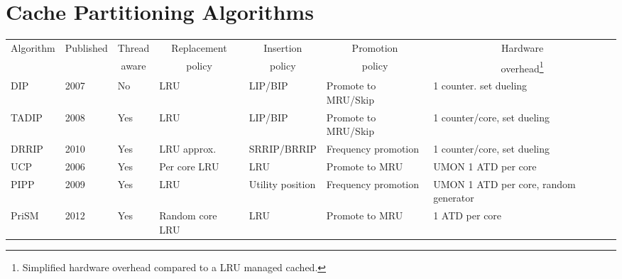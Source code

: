 
\chapter{Cache Partitioning Algorithms}
\label{cpt:algorithms}

\begin{table}[h]
\begin{tabular}{|l|l|l|l|l|l|l|}
\hline
\multicolumn{1}{|c|}{Algorithm} & \multicolumn{1}{c|}{Published} & \multicolumn{1}{c|}{Thread} & \multicolumn{1}{c|}{Replacement} & \multicolumn{1}{c|}{Insertion} & \multicolumn{1}{c|}{Promotion} & \multicolumn{1}{c|}{Hardware}         \\
\multicolumn{1}{|c|}{}          & \multicolumn{1}{c|}{}          & \multicolumn{1}{c|}{aware}  & \multicolumn{1}{c|}{policy}      & \multicolumn{1}{c|}{policy}    & \multicolumn{1}{c|}{policy}    & \multicolumn{1}{c|}{overhead\footnote{Simplified hardware overhead compared to a LRU managed cached.}}         \\ \hline
DIP                             & 2007                           & No                          & LRU                              & LIP/BIP                        & Promote to MRU/Skip            & 1 counter. set dueling                \\ \hline
TADIP                           & 2008                           & Yes                         & LRU                              & LIP/BIP                        & Promote to MRU/Skip            & 1 counter/core, set dueling           \\ \hline
DRRIP                           & 2010                           & Yes                         & LRU approx.                      & SRRIP/BRRIP                    & Frequency promotion            & 1 counter/core, set dueling           \\ \hline
UCP                             & 2006                           & Yes                         & Per core LRU                     & LRU                            & Promote to MRU                 & UMON 1 ATD per core                   \\ \hline
PIPP                            & 2009                           & Yes                         & LRU                              & Utility position               & Frequency promotion            & UMON 1 ATD per core, random generator \\ \hline
PriSM                           & 2012                           & Yes                         & Random core LRU                  & LRU                            & Promote to MRU                 & 1 ATD per core                        \\ \hline

\end{tabular}
\end{table}
